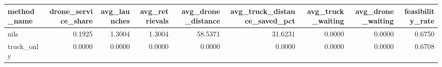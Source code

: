 \begin{tabular}{lrrrrrrrr}
\toprule
method_name & drone_service_share & avg_launches & avg_retrievals & avg_drone_distance & avg_truck_distance_saved_pct & avg_truck_waiting & avg_drone_waiting & feasibility_rate \\
\midrule
nils & 0.1925 & 1.3004 & 1.3004 & 58.5371 & 31.6231 & 0.0000 & 0.0000 & 0.6750 \\
truck_only & 0.0000 & 0.0000 & 0.0000 & 0.0000 & 0.0000 & 0.0000 & 0.0000 & 0.6708 \\
\bottomrule
\end{tabular}
